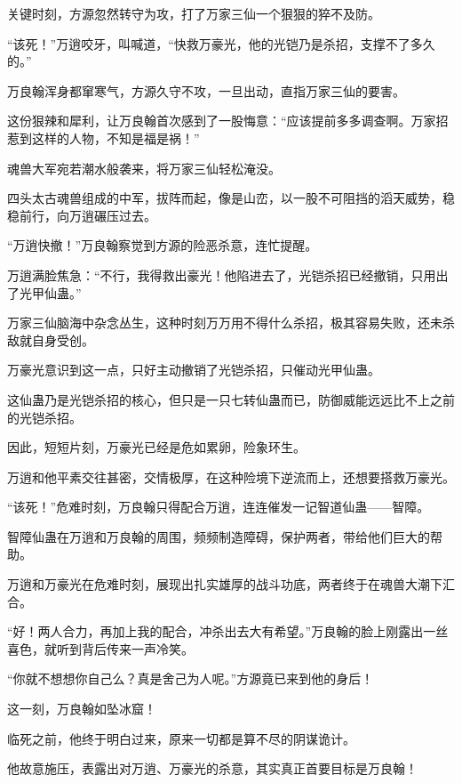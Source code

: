
\begin{this_body}



关键时刻，方源忽然转守为攻，打了万家三仙一个狠狠的猝不及防。

“该死！”万逍咬牙，叫喊道，“快救万豪光，他的光铠乃是杀招，支撑不了多久的。”

万良翰浑身都窜寒气，方源久守不攻，一旦出动，直指万家三仙的要害。

这份狠辣和犀利，让万良翰首次感到了一股悔意：“应该提前多多调查啊。万家招惹到这样的人物，不知是福是祸！”

魂兽大军宛若潮水般袭来，将万家三仙轻松淹没。

四头太古魂兽组成的中军，拔阵而起，像是山峦，以一股不可阻挡的滔天威势，稳稳前行，向万逍碾压过去。

“万逍快撤！”万良翰察觉到方源的险恶杀意，连忙提醒。

万逍满脸焦急：“不行，我得救出豪光！他陷进去了，光铠杀招已经撤销，只用出了光甲仙蛊。”

万家三仙脑海中杂念丛生，这种时刻万万用不得什么杀招，极其容易失败，还未杀敌就自身受创。

万豪光意识到这一点，只好主动撤销了光铠杀招，只催动光甲仙蛊。

这仙蛊乃是光铠杀招的核心，但只是一只七转仙蛊而已，防御威能远远比不上之前的光铠杀招。

因此，短短片刻，万豪光已经是危如累卵，险象环生。

万逍和他平素交往甚密，交情极厚，在这种险境下逆流而上，还想要搭救万豪光。

“该死！”危难时刻，万良翰只得配合万逍，连连催发一记智道仙蛊——智障。

智障仙蛊在万逍和万良翰的周围，频频制造障碍，保护两者，带给他们巨大的帮助。

万逍和万豪光在危难时刻，展现出扎实雄厚的战斗功底，两者终于在魂兽大潮下汇合。

“好！两人合力，再加上我的配合，冲杀出去大有希望。”万良翰的脸上刚露出一丝喜色，就听到背后传来一声冷笑。

“你就不想想你自己么？真是舍己为人呢。”方源竟已来到他的身后！

这一刻，万良翰如坠冰窟！

临死之前，他终于明白过来，原来一切都是算不尽的阴谋诡计。

他故意施压，表露出对万逍、万豪光的杀意，其实真正首要目标是万良翰！


\end{this_body}
